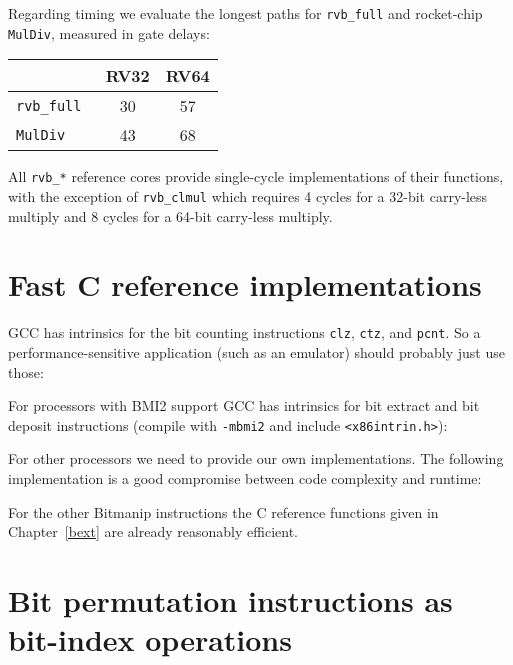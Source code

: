 Regarding timing we evaluate the longest paths for {\tt rvb\_full} and
rocket-chip {\tt MulDiv}, measured in gate delays:

\begin{center}
\begin{tabular}{lcc}
& RV32 & RV64 \\
\hline
\tt rvb\_full & 30 & 57 \\
\tt MulDiv & 43 & 68 \\
\end{tabular}
\end{center}

All {\tt rvb\_*} reference cores provide single-cycle implementations of their functions,
with the exception of {\tt rvb\_clmul} which requires 4 cycles for a 32-bit
carry-less multiply and 8 cycles for a 64-bit carry-less multiply.


\section{Fast C reference implementations}
\label{fastc}

GCC has intrinsics for the bit counting instructions {\tt clz}, {\tt ctz}, and
{\tt pcnt}.  So a performance-sensitive application (such as an emulator)
should probably just use those:



For processors with BMI2 support GCC has intrinsics for bit extract and bit
deposit instructions (compile with {\tt -mbmi2} and include {\tt <x86intrin.h>}):



For other processors we need to provide our own implementations. The following
implementation is a good compromise between code complexity and runtime:



For the other Bitmanip instructions the C reference functions given in Chapter~\ref{bext}
are already reasonably efficient.


\section{Bit permutation instructions as bit-index operations}

